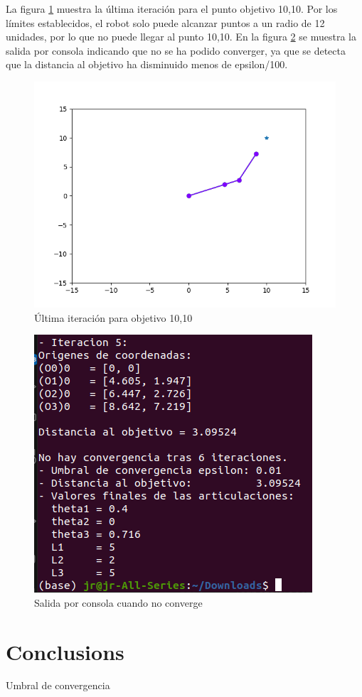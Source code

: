 La figura \ref{chapter:ccd_ejemplo5} muestra la última iteración para el punto objetivo 10,10. Por los límites establecidos, el robot solo puede alcanzar puntos a un radio de 12 unidades, por lo que no puede llegar al punto 10,10.
En la figura \ref{chapter:ccd_ejemplo6} se muestra la salida por consola indicando que no se ha podido converger, ya que se detecta que la distancia al objetivo ha disminuido menos de epsilon/100.
\begin{figure}[htb]
   \centering
   \includegraphics[width=.8\linewidth]{images/ccd_10.png}
   \caption{Última iteración para objetivo 10,10}
   \label{chapter:ccd_ejemplo5}
\end{figure}
\begin{figure}[htb]
   \centering
   \includegraphics[width=.6\linewidth]{images/ccd_11.png}
   \caption{Salida por consola cuando no converge}
   \label{chapter:ccd_ejemplo6}
\end{figure}


\section{Conclusions}

Umbral de convergencia